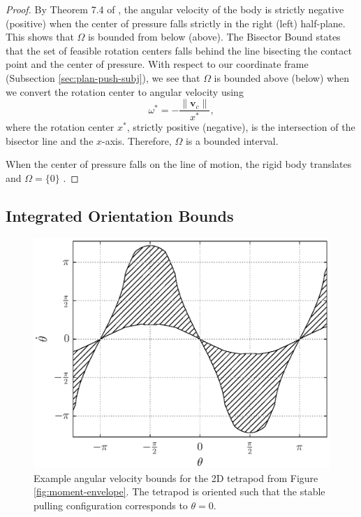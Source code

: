 \documentclass[conference]{IEEEtran}
\begin{document}
\begin{proof}
  By Theorem 7.4 of \cite{Mason}, the angular velocity of the body is
  strictly negative (positive) when the center of pressure falls
  strictly in the right (left) half-plane. This shows that $\Omega$ is
  bounded from below (above). The Bisector Bound \cite{Mason} states
  that the set of feasible rotation centers falls behind the line
  bisecting the contact point and the center of pressure. With respect
  to our coordinate frame (Subsection \ref{sec:plan-push-subj}), we
  see that $\Omega$ is bounded above (below) when we convert the
  rotation center to angular velocity using
  \begin{equation}
    \omega^* = -\frac{\lVert\mathbf{v}_c\rVert}{x^*}, \label{eq:rot-to-ang}
  \end{equation}
  where the rotation center $x^*$, strictly positive (negative), is
  the intersection of the bisector line and the $x$-axis. Therefore,
  $\Omega$ is a bounded interval.

  When the center of pressure falls on the line of motion, the rigid
  body translates and $\Omega = \{0\}$ \cite{Mason}.
\end{proof}

\subsection{Integrated Orientation Bounds}\label{sec:orientation-bounds}

\begin{figure}[t]
  \centering
    \includegraphics[width=1\linewidth]{fig/omega_bounds}
    \caption{Example angular velocity bounds for the 2D tetrapod from
      Figure \ref{fig:moment-envelope}. The tetrapod is oriented such
      that the stable pulling configuration corresponds to
      $\theta=0$.}
  \label{fig:omega-bounds}
\end{figure}
\end{document}
